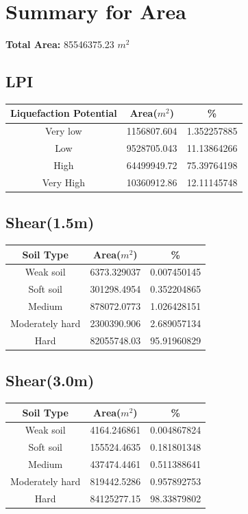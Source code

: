 \section{Summary for Area}
\textbf{Total Area:} 85546375.23 $m^2$\\
\begin{center}
\subsection{LPI}
\begin{tabular}{|c | c | c|} 
\hline
Liquefaction Potential & Area($m^2$) & \% \\
\hline
Very low & 1156807.604 & 1.352257885 \\
Low & 9528705.043 & 11.13864266 \\
High & 64499949.72 & 75.39764198 \\
Very High & 10360912.86 & 12.11145748 \\
\hline
\end{tabular}
\hfill

\subsection{Shear(1.5m)}
\begin{tabular}{|c | c | c|} 
\hline
Soil Type & Area($m^2$) & \% \\
\hline
Weak soil & 6373.329037	& 0.007450145 \\
Soft soil & 301298.4954	& 0.352204865 \\ 
Medium & 878072.0773	& 1.026428151 \\
Moderately hard & 2300390.906	& 2.689057134 \\
Hard & 82055748.03	& 95.91960829 \\
\hline
\end{tabular}

\subsection{Shear(3.0m)}
\begin{tabular}{|c | c | c|} 
\hline
Soil Type & Area($m^2$) & \% \\
\hline
Weak soil & 4164.246861 & 0.004867824 \\
Soft soil & 155524.4635 & 0.181801348 \\
Medium & 437474.4461 & 0.511388641 \\
Moderately hard & 819442.5286 & 0.957892753 \\
Hard & 84125277.15 & 98.33879802 \\
\hline
\end{tabular}


\end{center}
